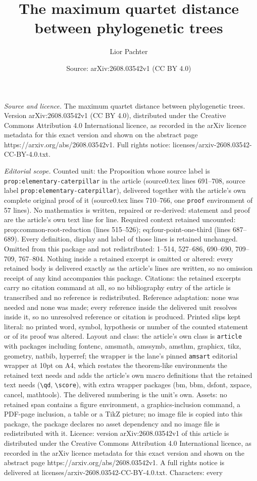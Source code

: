 \documentclass[10pt,a4paper]{amsart}
\title[The maximum quartet distance between phylogenetic trees]{The maximum quartet distance between phylogenetic trees}
\author{Lior Pachter}
\date{Source: arXiv:2608.03542v1 (CC BY 4.0)}
\begin{document}
\maketitle

\noindent\emph{Source and licence.} The maximum quartet distance between phylogenetic trees. Version arXiv:2608.03542v1 (CC BY 4.0), distributed under the Creative Commons Attribution 4.0 International licence, as recorded in the arXiv licence metadata for this exact version and shown on the abstract page https://arxiv.org/abs/2608.03542v1. Full rights notice: licenses/arxiv-2608.03542-CC-BY-4.0.txt.\par\smallskip

\noindent\textit{Editorial scope.} Counted unit: the Proposition whose source label is \texttt{prop:elementary-caterpillar} in the article (source0.tex lines 691--708, source label \texttt{prop:elementary-caterpillar}), delivered together with the article's own complete original proof of it (source0.tex lines 710--766, one \texttt{proof} environment of 57 lines). No mathematics is written, repaired or re-derived: statement and proof are the article's own text line for line. Required context retained uncounted: prop:common-root-reduction (lines 515--526); eq:four-point-one-third (lines 687--689). Every definition, display and label of those lines is retained unchanged. Omitted from this package and not redistributed: 1--514, 527--686, 690--690, 709--709, 767--804. Nothing inside a retained excerpt is omitted or altered: every retained body is delivered exactly as the article's lines are written, so no omission receipt of any kind accompanies this package. Citations: the retained excerpts carry no citation command at all, so no bibliography entry of the article is transcribed and no reference is redistributed. Reference adaptation: none was needed and none was made; every reference inside the delivered unit resolves inside it, so no unresolved reference or citation is produced. Printed slips kept literal: no printed word, symbol, hypothesis or number of the counted statement or of its proof was altered. Layout and class: the article's own class is \texttt{article} with packages including fontenc, amsmath, amssymb, amsthm, graphicx, tikz, geometry, natbib, hyperref; the wrapper is the lane's pinned \texttt{amsart} editorial wrapper at 10pt on A4, which restates the theorem-like environments the retained text needs and adds the article's own macro definitions that the retained text needs (\texttt{\textbackslash qd}, \texttt{\textbackslash score}), with extra wrapper packages (bm, bbm, dsfont, xspace, cancel, mathtools). The delivered numbering is the unit's own. Assets: no retained span contains a figure environment, a graphics-inclusion command, a PDF-page inclusion, a table or a TikZ picture; no image file is copied into this package, the package declares no asset dependency and no image file is redistributed with it. Licence: version arXiv:2608.03542v1 of this article is distributed under the Creative Commons Attribution 4.0 International licence, as recorded in the arXiv licence metadata for this exact version and shown on the abstract page https://arxiv.org/abs/2608.03542v1. A full rights notice is delivered at licenses/arxiv-2608.03542-CC-BY-4.0.txt. Characters: every 
\end{document}
